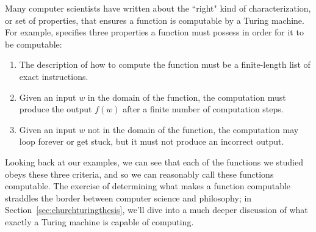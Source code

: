 Many computer scientists have written about the ``right" kind of characterization, or set of properties, that ensures a function is computable by a Turing machine. For example, \citet{Enderton1977ElementsRecursionTheory} specifies three properties a function must possess in order for it to be computable:
\begin{colouredbox}
\begin{enumerate}
\item The description of how to compute the function must be a finite-length list of exact instructions.
\item Given an input $w$ in the domain of the function, the computation must produce the output $f(w)$ after a finite number of computation steps.
\item Given an input $w$ not in the domain of the function, the computation may loop forever or get stuck, but it must not produce an incorrect output.
\end{enumerate}
\end{colouredbox}
Looking back at our examples, we can see that each of the functions we studied obeys these three criteria, and so we can reasonably call these functions computable. The exercise of determining what makes a function computable straddles the border between computer science and philosophy; in Section~\ref{sec:churchturingthesis}, we'll dive into a much deeper discussion of what exactly a Turing machine is capable of computing.
